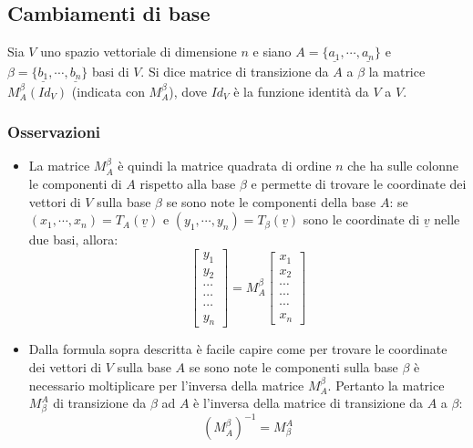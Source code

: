 \subsection{Cambiamenti di base}
Sia $V$ uno spazio vettoriale di dimensione $n$ e siano $A=\{\underline{a_1},\cdots,\underline{a_n}\}$ e $\beta=\{\underline{b_1},\cdots,\underline{b_n}\}$ basi di $V$. Si dice 
matrice di transizione da $A$ a $\beta$ la matrice $M_A^\beta(Id_V)$ (indicata con $M_A^\beta$), dove $Id_V$ \`e la funzione identit\`a da $V$ a $V$.
\subsubsection{Osservazioni}
\begin{itemize}
\item La matrice $M_A^\beta$ \`e quindi la matrice quadrata di ordine $n$ che ha sulle colonne le componenti di $A$ rispetto alla base $\beta$ e permette di trovare le coordinate
dei vettori di $V$ sulla base $\beta$ se sono note le componenti della base $A$: se $(x_1,\cdots,x_n)=T_A(\underline{v})$ e $(y_1,\cdots,y_n)=T_\beta(\underline{v})$ sono le
coordinate di $\underline{v}$ nelle due basi, allora:
\begin{equation}
\left[\begin{matrix}
y_1\\
y_2\\
\cdots\\
\cdots\\
\cdots\\
y_n
\end{matrix}\right]
=M_A^\beta
\left[\begin{matrix}
x_1\\
x_2\\
\cdots\\
\cdots\\
\cdots\\
x_n
\end{matrix}\right]
\end{equation}
\item Dalla formula sopra descritta \`e facile capire come per trovare le coordinate dei vettori di $V$ sulla base $A$ se sono note le componenti sulla base $\beta$ \`e 
necessario moltiplicare per l'inversa della matrice $M_A^\beta$. Pertanto la matrice $M_\beta^A$ di transizione da $\beta$ ad $A$ \`e l'inversa della matrice di transizione da 
$A$ a $\beta$:
\begin{equation}
(M_A^\beta)^{-1}=M^A_\beta
\end{equation}
\end{itemize}
